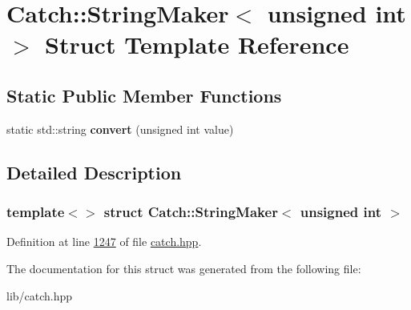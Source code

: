 \hypertarget{structCatch_1_1StringMaker_3_01unsigned_01int_01_4}{}\section{Catch\+::String\+Maker$<$ unsigned int $>$ Struct Template Reference}
\label{structCatch_1_1StringMaker_3_01unsigned_01int_01_4}
\subsection*{Static Public Member Functions}
\begin{DoxyCompactItemize}
\item 
\mbox{\label{structCatch_1_1StringMaker_3_01unsigned_01int_01_4_aa0ec816ef8a65664b0524d55d08e2fd9}} 
static std\+::string {\bfseries convert} (unsigned int value)
\end{DoxyCompactItemize}


\subsection{Detailed Description}
\subsubsection*{template$<$$>$\newline
struct Catch\+::\+String\+Maker$<$ unsigned int $>$}



Definition at line \mbox{\hyperlink{catch_8hpp_source_l01247}{1247}} of file \mbox{\hyperlink{catch_8hpp_source}{catch.\+hpp}}.



The documentation for this struct was generated from the following file\+:\begin{DoxyCompactItemize}
\item 
lib/catch.\+hpp\end{DoxyCompactItemize}
